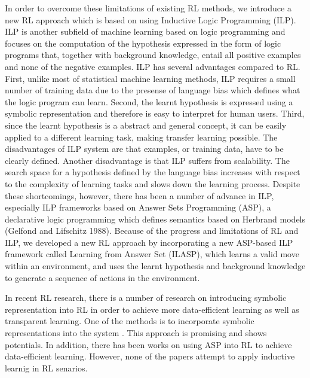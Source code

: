In order to overcome these limitations of existing RL methods, we introduce a new RL approach which is based on using Inductive Logic Programming (ILP). 
ILP is another subfield of machine learning based on logic programming and focuses on the computation of the hypothesis expressed in the form of logic programs that, together with background knowledge, entail all positive examples and none of the negative examples. 
ILP has several advantages compared to RL. 
First, unlike most of statistical machine learning methods, ILP requires a small number of training data due to the presense of language bias which defines what the logic program can learn.
Second, the learnt hypothesis is expressed using a symbolic representation and therefore is easy to interpret for human users.
Third, since the learnt hypothesis is a abstract and general concept, it can be easily applied to a different learning task, making transfer learning possible.
The disadvantages of ILP system are that examples, or training data, have to be clearly defined.
Another disadvantage is that ILP suffers from scalability. 
The search space for a hypothesis defined by the language bias increases with respect to the complexity of learning tasks and slows down the learning process.
Despite these shortcomings, however, there has been a number of advance in ILP, especially ILP frameworks based on Answer Sets Programming (ASP), a declarative logic programming which defines semantics based on Herbrand models (Gelfond and Lifschitz 1988).
Because of the progress and limitations of RL and ILP, we developed a new RL approach by incorporating a new ASP-based ILP framework called Learning from Answer Set (ILASP), which learns a valid move within an environment, 
and uses the learnt hypothesis and background knowledge to generate a sequence of actions in the environment. 

In recent RL research, there is a number of research on introducing symbolic representation into RL in order to achieve more data-efficient learning as well as transparent learning. 
One of the methods is to incorporate symbolic representations into the system \cite{Garnelo2016}. This approach is promising and shows potentials.
In addition, there has been works on using ASP into RL to achieve data-efficient learning.
However, none of the papers attempt to apply inductive learnig in RL senarios. 

